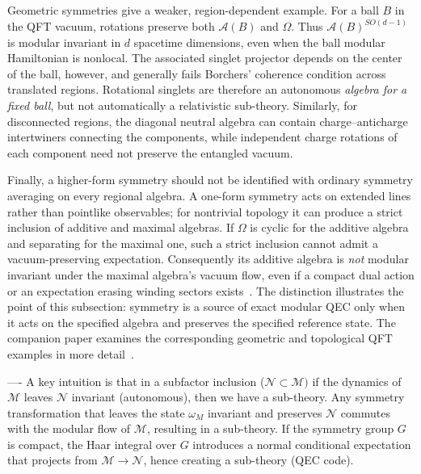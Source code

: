 \documentclass[a4paper,11pt]{article}
\theoremstyle{definition}
\newcommand{\mN}{\mathcal{N}}
\newcommand{\mM}{\mathcal{M}}
\begin{document}
Geometric symmetries give a weaker, region-dependent example. For a
ball $B$ in the QFT vacuum, rotations preserve both $\mathcal A(B)$ and
$\Omega$. Thus $\mathcal A(B)^{SO(d-1)}$ is modular invariant in
$d$ spacetime dimensions, even when the ball modular Hamiltonian is
nonlocal. The associated singlet projector depends on the center of the
ball, however, and generally fails Borchers' coherence condition across
translated regions. Rotational singlets are therefore an autonomous
\emph{algebra for a fixed ball}, but not automatically a relativistic
sub-theory. Similarly, for disconnected regions, the diagonal neutral
algebra can contain charge--anticharge intertwiners connecting the
components, while independent charge rotations of each component need
not preserve the entangled vacuum.

Finally, a higher-form symmetry should not be identified with ordinary
symmetry averaging on every regional algebra. A one-form symmetry acts
on extended lines rather than pointlike observables; for nontrivial
topology it can produce a strict inclusion of additive and maximal
algebras. If $\Omega$ is cyclic for the additive algebra and separating
for the maximal one, such a strict inclusion cannot admit a
vacuum-preserving expectation. Consequently its additive algebra is
\emph{not} modular invariant under the maximal algebra's vacuum flow,
even if a compact dual action or an expectation erasing winding sectors
exists~\cite{GaiottoKapustinSeibergWillett2015,CasiniHuertaMaganPontello2021}.
The distinction illustrates the point of this subsection: symmetry is a
source of exact modular QEC only when it acts on the specified algebra
and preserves the specified reference state. The companion paper
examines the corresponding geometric and topological QFT examples in
more detail~\cite{companionQFT}.


----
A key intuition is that in a subfactor inclusion ($\mN\subset \mM)$ if the dynamics of $\mM$ leaves $\mN$ invariant (autonomous), then we have a sub-theory. Any symmetry transformation that leaves the state $\omega_M$ invariant and preserves $\mN$ commutes with the modular flow of $\mM$, resulting in a sub-theory. If the symmetry group $G$ is compact, the Haar integral over $G$ introduces a normal conditional expectation that projects from $\mM\to \mN$, hence creating a sub-theory (QEC code).

\end{document}
